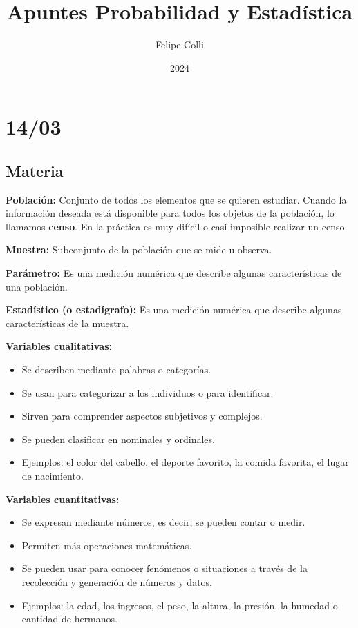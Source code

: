 \documentclass[12pt, letterpaper]{article}
\title{Apuntes Probabilidad y Estadística}
\author{Felipe Colli}
\date{2024}
\begin{document}
\maketitle
\tableofcontents
\newpage %

\section{14/03}
\subsection{Materia}
\textbf{Población:} %
Conjunto de todos los elementos que se quieren estudiar. Cuando la información deseada está disponible para todos los objetos de la población, lo llamamos \textbf{censo}. En la práctica es muy difícil o casi imposible realizar un censo.

\textbf{Muestra:} %
Subconjunto de la población que se mide u observa.

\textbf{Parámetro:} %
Es una medición numérica que describe algunas características de una población.

\textbf{Estadístico (o estadígrafo):} %
Es una medición numérica que describe algunas características de la muestra.

\textbf{Variables cualitativas:} %
\begin{itemize}
    \item Se describen mediante palabras o categorías.
    \item Se usan para categorizar a los individuos o para identificar.
    \item Sirven para comprender aspectos subjetivos y complejos.
    \item Se pueden clasificar en nominales y ordinales.
    \item Ejemplos: el color del cabello, el deporte favorito, la comida favorita, el lugar de nacimiento.
\end{itemize}

\textbf{Variables cuantitativas:} %
\begin{itemize}
    \item Se expresan mediante números, es decir, se pueden contar o medir.
    \item Permiten más operaciones matemáticas.
    \item Se pueden usar para conocer fenómenos o situaciones a través de la recolección y generación de números y datos.
    \item Ejemplos: la edad, los ingresos, el peso, la altura, la presión, la humedad o cantidad de hermanos.
\end{itemize}
\end{document}

